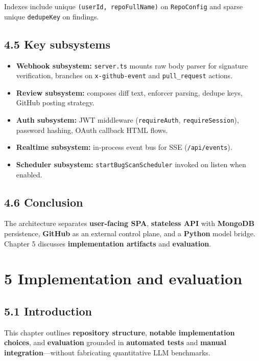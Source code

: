 \documentclass[11pt,a4paper]{report}
\begin{document}
Indexes include unique \texttt{(userId, repoFullName)} on \texttt{RepoConfig} and sparse unique \texttt{dedupeKey} on findings.


\section{4.5 Key subsystems}


\begin{itemize}
\item \textbf{Webhook subsystem:} \texttt{server.ts} mounts raw body parser for signature verification, branches on \texttt{x-github-event} and \texttt{pull\_request} actions.
\item \textbf{Review subsystem:} composes diff text, enforcer parsing, dedupe keys, GitHub posting strategy.
\item \textbf{Auth subsystem:} JWT middleware (\texttt{requireAuth}, \texttt{requireSession}), password hashing, OAuth callback HTML flows.
\item \textbf{Realtime subsystem:} in-process event bus for SSE (\texttt{/api/events}).
\item \textbf{Scheduler subsystem:} \texttt{startBugScanScheduler} invoked on listen when enabled.
\end{itemize}


\section{4.6 Conclusion}


The architecture separates \textbf{user-facing SPA}, \textbf{stateless API} with \textbf{MongoDB} persistence, \textbf{GitHub} as an external control plane, and a \textbf{Python} model bridge. Chapter 5 discusses \textbf{implementation artifacts} and \textbf{evaluation}.



\chapter{5 Implementation and evaluation}


\section{5.1 Introduction}


This chapter outlines \textbf{repository structure}, \textbf{notable implementation choices}, and \textbf{evaluation} grounded in \textbf{automated tests} and \textbf{manual integration}—without fabricating quantitative LLM benchmarks.
\end{document}
